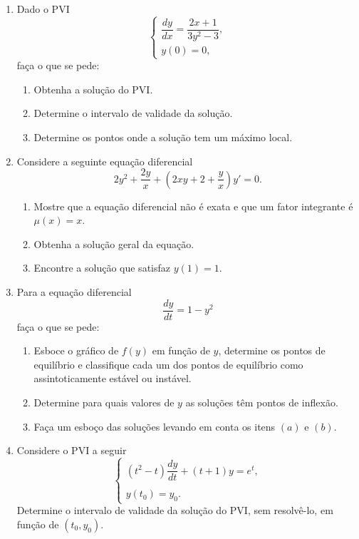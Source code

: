 \documentclass[a4paper,11pt]{report}
\begin{document}
\begin{enumerate}
    \item Dado o PVI
    \[
    \begin{cases}
        \dfrac{dy}{dx}=\dfrac{2x+1}{3y^2-3},\\
        y(0)=0,
    \end{cases}
    \]
    faça o que se pede:
    \begin{enumerate}
        \item Obtenha a solução do PVI.
        \item Determine o intervalo de validade da solução.
        \item Determine os pontos onde a solução tem um máximo local.
    \end{enumerate}
    \newpage
    \item Considere a seguinte equação diferencial
    \[2y^2 + \frac{2y}{x} + \left(2xy+2+\frac{y}{x}\right)y' = 0.\]
    \begin{enumerate}
        \item Mostre que a equação diferencial não é exata e que um fator integrante é $\mu(x)=x$.
        \item Obtenha a solução geral da equação.
        \item Encontre a solução que satisfaz $y(1)=1$.
    \end{enumerate}
    \newpage
    \item Para a equação diferencial
    \[\dfrac{dy}{dt} = 1-y^2\]
    faça o que se pede:
    \begin{enumerate}
        \item Esboce o gráfico de $f(y)$ em função de $y$, determine os pontos de equilíbrio e classifique cada um dos pontos de equilíbrio como assintoticamente estável ou instável.
        \item Determine para quais valores de $y$ as soluções têm pontos de inflexão.
        \item Faça um esboço das soluções levando em conta os itens $(a)$ e $(b)$.

    \end{enumerate}
    \newpage
    \item Considere o PVI a seguir
    \[
    \begin{cases}
        (t^2-t)\dfrac{dy}{dt}+(t+1)y=e^t,\\\\
        y(t_0)=y_0.
    \end{cases}
    \]
    Determine o intervalo de validade da solução do PVI, sem resolvê-lo, em função de $(t_0,y_0)$.
\end{enumerate}
\end{document}
